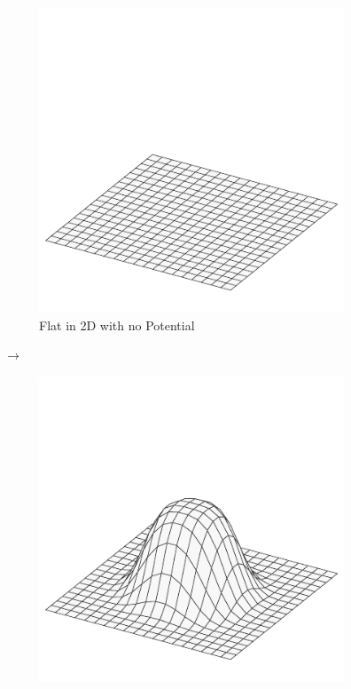 \documentclass[crop=false]{stdlocal}
\begin{document}
  \begin{figure}
    \centering
    \begin{subfigure}[c]{0.4\linewidth}
      \centering
      \includegraphics[width=\linewidth,trim={0mm 0 0 60},clip]{plots/plane.pdf}
      \caption{Flat in 2D with no Potential}
      \label{fig:lifting-flat}
    \end{subfigure}
    \hfill
    $\longrightarrow$
    \hfill
    \begin{subfigure}[c]{0.4\linewidth}
      \centering
      \includegraphics[width=\linewidth,trim={0mm 0 0 60},clip]{plots/gauss.pdf}

\end{subfigure}
\end{figure}
\end{document}
